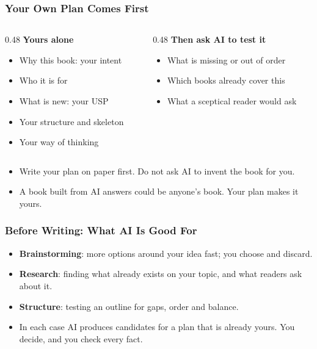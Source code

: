 
\begin{frame}[fragile]\frametitle{Your Own Plan Comes First}
\begin{columns}
    \begin{column}[T]{0.48\linewidth}
    \textbf{Yours alone}
    \begin{itemize}
    \item Why this book: your intent
    \item Who it is for
    \item What is new: your USP
    \item Your structure and skeleton
    \item Your way of thinking
    \end{itemize}
    \end{column}
    \begin{column}[T]{0.48\linewidth}
    \textbf{Then ask AI to test it}
    \begin{itemize}
    \item What is missing or out of order
    \item Which books already cover this
    \item What a sceptical reader would ask
    \end{itemize}
    \end{column}
\end{columns}
\medskip
\begin{itemize}
\item Write your plan on paper first. Do not ask AI to invent the book for you.
\item A book built from AI answers could be anyone's book. Your plan makes it yours.
\end{itemize}
\end{frame}

\begin{frame}[fragile]\frametitle{Before Writing: What AI Is Good For}
\begin{itemize}
\item \textbf{Brainstorming}: more options around your idea fast; you choose and discard.
\item \textbf{Research}: finding what already exists on your topic, and what readers ask about it.
\item \textbf{Structure}: testing an outline for gaps, order and balance.
\item In each case AI produces candidates for a plan that is already yours. You decide, and you check every fact.
\end{itemize}
\end{frame}

